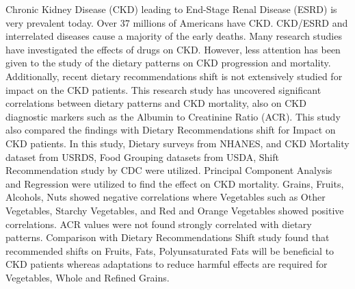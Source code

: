 Chronic Kidney Disease (CKD) leading to End-Stage Renal Disease (ESRD) is very prevalent today. Over 37 millions of Americans have CKD. CKD/ESRD and interrelated diseases cause a majority of the early deaths.  Many research studies have investigated the effects of drugs on CKD. However, less attention has been given to the study of the dietary patterns on CKD progression and mortality. Additionally, recent dietary recommendations shift is not extensively studied for impact on the CKD patients. This research study has uncovered significant correlations between dietary patterns and CKD mortality, also on CKD diagnostic markers such as the Albumin to Creatinine Ratio (ACR). This study also compared the findings with Dietary Recommendations shift for Impact on CKD patients. In this study, Dietary surveys from NHANES, and CKD Mortality dataset from USRDS, Food Grouping datasets from USDA, Shift Recommendation study by CDC were utilized. Principal Component Analysis and Regression were utilized to find the effect on CKD mortality. Grains, Fruits, Alcohols, Nuts showed negative correlations where Vegetables such as Other Vegetables, Starchy Vegetables, and Red and Orange Vegetables showed positive correlations. ACR values were not found strongly correlated with dietary patterns. Comparison with Dietary Recommendations Shift study found that recommended shifts on Fruits, Fats, Polyunsaturated Fats will be beneficial to CKD patients whereas adaptations to reduce harmful effects are required for Vegetables, Whole and Refined Grains.